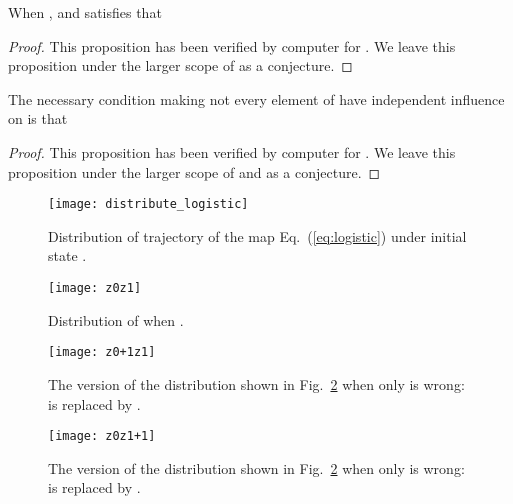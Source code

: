 \documentclass[twocolumn]{svjour3}
\newlength\imagewidth
\begin{document}
\begin{proposition}
When ,  and  satisfies that

\label{prop:period}
\end{proposition}
\begin{proof}
This proposition has been verified by computer for . We leave
this proposition under the larger scope of  as a conjecture.
\end{proof}

\begin{proposition}
The necessary condition making not every element of 
have independent influence on 
is that

\label{prop:condition}
\end{proposition}
\begin{proof}
This proposition has been verified by computer for . We leave
this proposition under the larger scope of  and  as a conjecture.
\end{proof}

\begin{figure}[!htb]
\centering
\begin{minipage}[t]{\imagewidth}
\centering
\texttt{[image: distribute\_logistic]}
\end{minipage}
\caption{Distribution of trajectory of the map Eq.~(\ref{eq:logistic}) under initial state .}
\label{fig:distribute4logistic}
\end{figure}

\begin{figure}[!htb]
\centering
\begin{minipage}[t]{\imagewidth}
\centering
\texttt{[image: z0z1]}
\end{minipage}
\caption{Distribution of   when .}
\label{fig:z0z1}
\end{figure}

\begin{figure}[!htb]
\centering
\begin{minipage}[t]{\imagewidth}
\centering
\texttt{[image: z0+1z1]}
\end{minipage}
\caption{The version of the distribution shown in Fig.~\ref{fig:z0z1} when only  is wrong:  is replaced by .}
\label{fig:z0+1z1}
\end{figure}

\begin{figure}[!htb]
\centering
\begin{minipage}[t]{\imagewidth}
\centering
\texttt{[image: z0z1+1]}
\end{minipage}
\caption{The version of the distribution shown in Fig.~\ref{fig:z0z1} when only 
is wrong:  is replaced by .
}
\label{fig:z0z1+1}
\end{figure}
\end{document}
